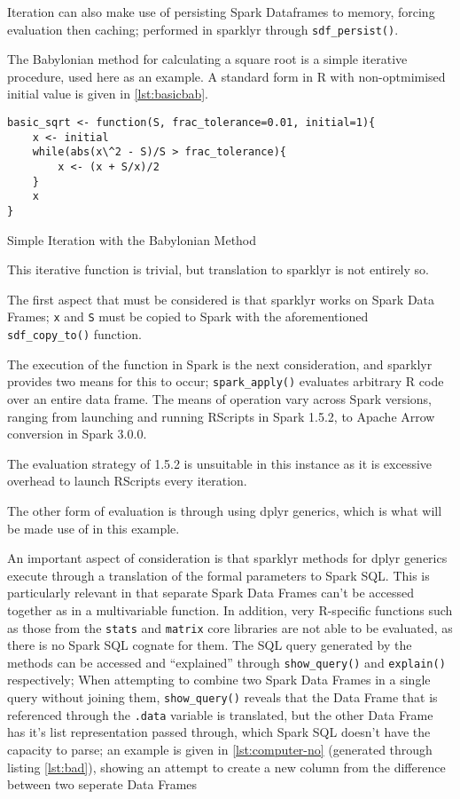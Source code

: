 Iteration can also make use of persisting Spark Dataframes to memory,
forcing evaluation then caching; performed in sparklyr through
\texttt{sdf_persist()}.

The Babylonian method for calculating a square root is a simple
iterative procedure, used here as an example. A standard form in R with
non-optmimised initial value is given in \cref{lst:basicbab}.

\begin{listing}
	\begin{verbatim}
basic_sqrt <- function(S, frac_tolerance=0.01, initial=1){
	x <- initial
	while(abs(x\^2 - S)/S > frac_tolerance){
		x <- (x + S/x)/2
	}
	x
}
\end{verbatim}
	\caption{Simple Iteration with the Babylonian Method}
	\label{lst:basicbab}
\end{listing}


This iterative function is trivial, but translation to sparklyr is not
entirely so.

The first aspect that must be considered is that sparklyr works on Spark
Data Frames; \texttt{x} and \texttt{S} must be copied to Spark with the
aforementioned \texttt{sdf_copy_to()}
function.

The execution of the function in Spark is the next consideration, and
sparklyr provides two means for this to occur;
\texttt{spark_apply()} evaluates arbitrary R
code over an entire data frame. The means of operation vary across Spark
versions, ranging from launching and running RScripts in Spark 1.5.2, to
Apache Arrow conversion in Spark 3.0.0.

The evaluation strategy of 1.5.2 is unsuitable in this instance as it is
excessive overhead to launch RScripts every iteration.

The other form of evaluation is through using dplyr generics, which is
what will be made use of in this example.

An important aspect of consideration is that sparklyr methods for dplyr
generics execute through a translation of the formal parameters to Spark
SQL. This is particularly relevant in that separate Spark Data Frames
can't be accessed together as in a multivariable function. In addition,
very R-specific functions such as those from the \texttt{stats} and
\texttt{matrix} core libraries are not able to be evaluated, as there is
no Spark SQL cognate for them. The SQL query generated by the methods
can be accessed and ``explained'' through
\texttt{show_query()} and
\texttt{explain()} respectively; When attempting
to combine two Spark Data Frames in a single query without joining them,
\texttt{show_query()} reveals that the Data
Frame that is referenced through the \texttt{.data} variable is
translated, but the other Data Frame has it's list representation passed
through, which Spark SQL doesn't have the capacity to parse; an example
is given in \cref{lst:computer-no} (generated through listing
\cref{lst:bad}), showing an attempt to create a new column from the
difference between two seperate Data Frames

